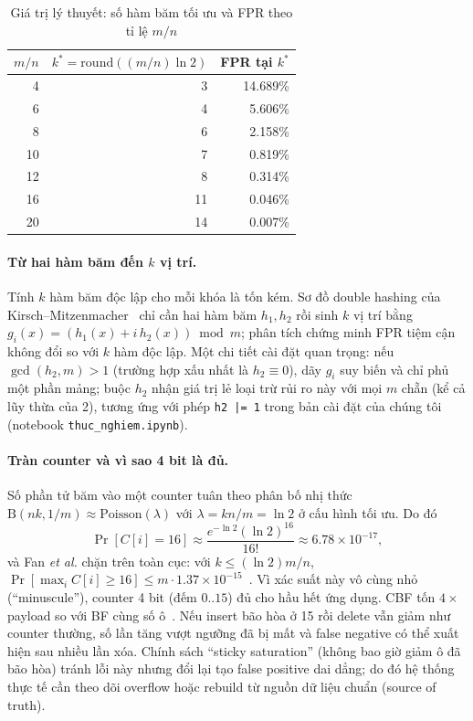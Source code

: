 \documentclass[11pt,a4paper]{article}
\begin{document}
\begin{table}[H]\centering
\caption{Giá trị lý thuyết: số hàm băm tối ưu và FPR theo tỉ lệ $m/n$}
\label{tab:theory}
\begin{tabular}{@{}rrr@{}}
\toprule
$m/n$ & $k^{*}=\mathrm{round}((m/n)\ln 2)$ & FPR tại $k^{*}$\\
\midrule
4  & 3  & 14.689\% \\
6  & 4  & 5.606\% \\
8  & 6  & 2.158\% \\
10 & 7  & 0.819\% \\
12 & 8  & 0.314\% \\
16 & 11 & 0.046\% \\
20 & 14 & 0.007\% \\
\bottomrule
\end{tabular}
\end{table}

\paragraph{Từ hai hàm băm đến $k$ vị trí.}
Tính $k$ hàm băm độc lập cho mỗi khóa là tốn kém. Sơ đồ double hashing của
Kirsch--Mitzenmacher~\cite{kirsch2008} chỉ cần hai hàm băm $h_1,h_2$ rồi
sinh $k$ vị trí bằng $g_i(x)=(h_1(x)+i\,h_2(x)) \bmod m$; phân tích chứng
minh FPR tiệm cận không đổi so với $k$ hàm độc lập. Một chi tiết cài đặt
quan trọng: nếu $\gcd(h_2,m)>1$ (trường hợp xấu nhất là $h_2\equiv 0$), dãy
$g_i$ suy biến và chỉ phủ một phần mảng; buộc $h_2$ nhận giá trị lẻ loại trừ
rủi ro này với mọi $m$ chẵn (kể cả lũy thừa của 2), tương ứng với phép
\texttt{h2 |= 1} trong bản cài đặt của chúng tôi
(notebook \texttt{thuc\_nghiem.ipynb}).

\paragraph{Tràn counter và vì sao 4 bit là đủ.}
Số phần tử băm vào một counter tuân theo phân bố nhị thức
$\mathrm{B}(nk,1/m)\approx\mathrm{Poisson}(\lambda)$ với $\lambda=kn/m=\ln 2$
ở cấu hình tối ưu. Do đó
\begin{equation}
\Pr[C[i]=16]\approx \frac{e^{-\ln 2}(\ln 2)^{16}}{16!}\approx
6.78\times10^{-17},
\end{equation}
và Fan \emph{et al.} chặn trên toàn cục: với $k\le(\ln 2)m/n$,
$\Pr[\max_i C[i]\ge 16]\le m\cdot 1.37\times10^{-15}$~\cite{fan2000}. Vì
xác suất này vô cùng nhỏ (``minuscule''), counter 4 bit (đếm $0..15$) đủ cho
hầu hết ứng dụng. CBF tốn $4\times$ payload so với BF cùng số ô~\cite{broder2004}.
Nếu insert bão hòa ở 15 rồi delete vẫn giảm như counter thường, số lần tăng
vượt ngưỡng đã bị mất và false negative có thể xuất hiện sau nhiều lần xóa.
Chính sách ``sticky saturation'' (không bao giờ giảm ô đã bão hòa) tránh lỗi
này nhưng đổi lại tạo false positive dai dẳng; do đó hệ thống thực tế cần
theo dõi overflow hoặc rebuild từ nguồn dữ liệu chuẩn (source of truth).
\end{document}
